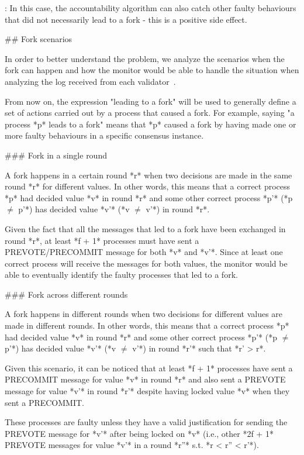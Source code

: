 \documentclass[a4paper,11pt,oneside]{report}
\begin{document}
\begin{markdown}
[^2]: In this case, the accountability algorithm can also catch other faulty behaviours that did not necessarily lead to a fork - this is a positive side effect.

## Fork scenarios

In order to better understand the problem, we analyze the scenarios when the fork can happen and how the monitor would be able to handle the situation when analyzing the log received from each validator~\cite{fork-scenarios}.

From now on, the expression "leading to a fork" will be used to generally define a set of actions carried out by a process that caused a fork. 
For example, saying "a process *p* leads to a fork" means that *p* caused a fork by having made one or more faulty behaviours in a specific consensus instance.

### Fork in a single round

A fork happens in a certain round *r* when two decisions are made in the same round *r* for different values.
In other words, this means that a correct process *p* had decided value *v* in round *r* and some other correct process *p'* (*p $\neq$ p'*) has decided value *v'* (*v $\neq$ v'*) in round *r*. 

Given the fact that all the messages that led to a fork have been exchanged in round *r*, at least *f + 1* processes must have sent a PREVOTE/PRECOMMIT message for both *v* and *v'*.
Since at least one correct process will receive the messages for both values, the monitor would be able to eventually identify the faulty processes that led to a fork.  

### Fork across different rounds

A fork happens in different rounds when two decisions for different values are made in different rounds. 
In other words, this means that a correct process *p* had decided value *v* in round *r* and some other correct process *p'* (*p $\neq$ p'*) has decided value *v'* (*v $\neq$ v'*) in round *r'* such that *r' > r*. 

Given this scenario, it can be noticed that at least *f + 1* processes have sent a PRECOMMIT message for value *v* in round *r* and also sent a PREVOTE message for value *v'* in round *r'* despite having locked value *v* when they sent a PRECOMMIT.

These processes are faulty unless they have a valid justification for sending the PREVOTE message for *v'* after being locked on *v* (i.e., other *2f + 1* PREVOTE messages for value *v'* in a round *r''* s.t. *r < r'' < r'*).
 

\end{markdown}
\end{document}
